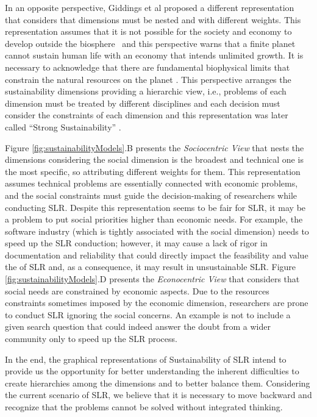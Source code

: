 \documentclass{article}
\begin{document}
In an opposite perspective, Giddings et al \cite{Giddings2002Environment} proposed a different representation that considers that dimensions must be nested and with different weights. This representation assumes that it is not possible for the society and economy to develop outside the biosphere~\cite{MorandnAhuerma2019} and this perspective warns that a finite planet cannot sustain human life with an economy that intends unlimited growth. It is necessary to acknowledge that there are fundamental biophysical limits that constrain the natural resources on the planet \cite{Neumayer2013}. This perspective arranges the sustainability dimensions providing a hierarchic view, i.e., problems of each dimension must be treated by different disciplines and each decision must consider the constraints of each dimension \cite{Becker2015Sustainability} and this representation was later called ``Strong Sustainability'' \cite{MorandnAhuerma2019} .  

Figure \ref{fig:sustainabilityModels}.B presents the \textit{Sociocentric View} that nests the dimensions considering %
the social dimension is the broadest and technical one is the most specific, so attributing different weights for them. This representation assumes 
technical problems are essentially connected with economic problems, and the social constraints must guide the decision-making of researchers while conducting SLR. Despite this representation seems to be fair for SLR, it may be a problem to put social priorities higher than economic needs. For example, the software industry (which is tightly associated with the social dimension) needs to speed up the SLR conduction; however, it may cause a lack of rigor in documentation and reliability that could directly impact the feasibility and value the of SLR and, as a consequence, it may result in unsustainable SLR. Figure \ref{fig:sustainabilityModels}.D presents the \textit{Econocentric View} that considers that social needs are constrained by economic aspects. Due to the resources constraints sometimes imposed by the economic dimension, researchers are prone to conduct SLR ignoring the social concerns. An example is not to include a given search question that could indeed answer the doubt from a wider community only to speed up the SLR process.

In the end, the graphical representations of Sustainability of SLR intend to provide us the opportunity for better understanding the inherent difficulties to create hierarchies among the dimensions and to better balance them. Considering the current scenario of SLR, we believe that it is necessary to move backward and recognize that the problems cannot be solved without integrated thinking. 
\end{document}
